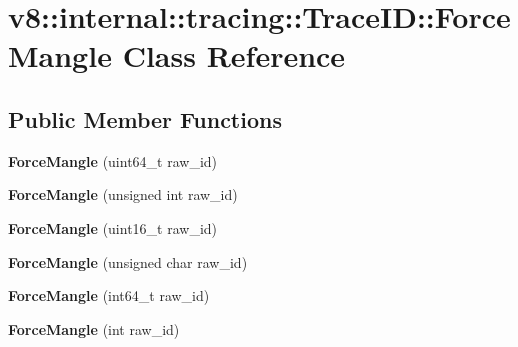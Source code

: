 \hypertarget{classv8_1_1internal_1_1tracing_1_1_trace_i_d_1_1_force_mangle}{}\section{v8\+:\+:internal\+:\+:tracing\+:\+:Trace\+ID\+:\+:Force\+Mangle Class Reference}
\label{classv8_1_1internal_1_1tracing_1_1_trace_i_d_1_1_force_mangle}
\subsection*{Public Member Functions}
\begin{DoxyCompactItemize}
\item 
{\bfseries Force\+Mangle} (uint64\+\_\+t raw\+\_\+id)\hypertarget{classv8_1_1internal_1_1tracing_1_1_trace_i_d_1_1_force_mangle_af6e5547598746b00122c7c083391937f}{}\label{classv8_1_1internal_1_1tracing_1_1_trace_i_d_1_1_force_mangle_af6e5547598746b00122c7c083391937f}

\item 
{\bfseries Force\+Mangle} (unsigned int raw\+\_\+id)\hypertarget{classv8_1_1internal_1_1tracing_1_1_trace_i_d_1_1_force_mangle_aeba32d43e1ae6179c38c620e583e6e74}{}\label{classv8_1_1internal_1_1tracing_1_1_trace_i_d_1_1_force_mangle_aeba32d43e1ae6179c38c620e583e6e74}

\item 
{\bfseries Force\+Mangle} (uint16\+\_\+t raw\+\_\+id)\hypertarget{classv8_1_1internal_1_1tracing_1_1_trace_i_d_1_1_force_mangle_ad4588a7b71f5b28b1fb87c858240ed2d}{}\label{classv8_1_1internal_1_1tracing_1_1_trace_i_d_1_1_force_mangle_ad4588a7b71f5b28b1fb87c858240ed2d}

\item 
{\bfseries Force\+Mangle} (unsigned char raw\+\_\+id)\hypertarget{classv8_1_1internal_1_1tracing_1_1_trace_i_d_1_1_force_mangle_a658789075cca6855826823b984c496ff}{}\label{classv8_1_1internal_1_1tracing_1_1_trace_i_d_1_1_force_mangle_a658789075cca6855826823b984c496ff}

\item 
{\bfseries Force\+Mangle} (int64\+\_\+t raw\+\_\+id)\hypertarget{classv8_1_1internal_1_1tracing_1_1_trace_i_d_1_1_force_mangle_ac554899f21bf88d1ca3cbd3f71b565af}{}\label{classv8_1_1internal_1_1tracing_1_1_trace_i_d_1_1_force_mangle_ac554899f21bf88d1ca3cbd3f71b565af}

\item 
{\bfseries Force\+Mangle} (int raw\+\_\+id)\hypertarget{classv8_1_1internal_1_1tracing_1_1_trace_i_d_1_1_force_mangle_a821dc69283a818ef702ff137a8b53c9b}{}\label{classv8_1_1internal_1_1tracing_1_1_trace_i_d_1_1_force_mangle_a821dc69283a818ef702ff137a8b53c9b}


\end{DoxyCompactItemize}
